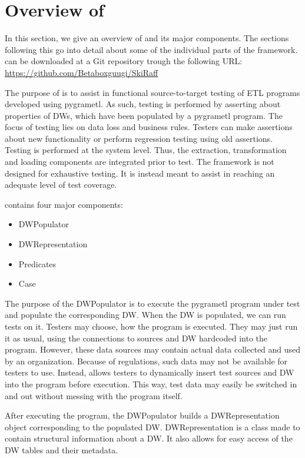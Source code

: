 \section{Overview of \FW{}}\label{sect:Overview}
In this section, we give an overview of \FW{} and its major components. The sections following this go into detail about some of the individual parts of the framework. \FW{} can be downloaded at a Git repository trough the following URL: \url{https://github.com/Betaboxguugi/SkiRaff}

The purpose of \FW{} is to assist in functional source-to-target testing of ETL programs developed using pygrametl. As such, testing is performed by asserting about properties of DWs, which have been populated by a pygrametl program. The focus of testing lies on data loss and business rules. Testers can make assertions about new functionality or perform regression testing using old assertions. Testing is performed at the system level. Thus, the extraction, transformation and loading components are integrated prior to test. The framework is not designed for exhaustive testing. It is instead meant to assist in reaching an adequate level of test coverage.

\FW{} contains four major components:
\begin{itemize}
\item DWPopulator
\item DWRepresentation
\item Predicates
\item Case 
\end{itemize}

The purpose of the DWPopulator is to execute the pygrametl program under test and populate the corresponding DW. When the DW is populated, we can run tests on it.  Testers may choose, how the program is executed. They may just run it as usual, using the connections to sources and DW hardcoded into the program. However, these data sources may contain actual data collected and used by an organization. Because of regulations, such data may not be available for testers to use. Instead, \FW{} allows testers to dynamically insert test sources and DW into the program before execution. This way, test data may easily be switched in and out without messing with the program itself.  

After executing the program, the DWPopulator builds a DWRepresentation object corresponding to the populated DW. DWRepresentation is a class made to contain structural information about a DW. It also allows for easy access of the DW tables and their metadata.

